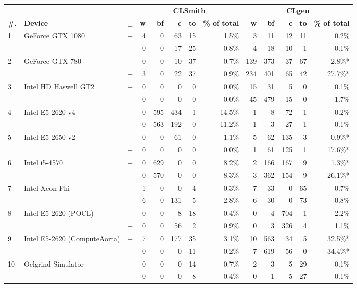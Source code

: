   \begin{tabular}{lll | rrrrr | rrrrr }
  \toprule
  & & & \multicolumn{5}{c|}{\textbf{CLSmith}} & \multicolumn{5}{c}{\textbf{CLgen}} \\
  \textbf{\#.} & \textbf{Device} & $\pm$ &
  \textbf{w} & \textbf{bf} & \textbf{c} & \textbf{to} & \textbf{\% of total} &
  \textbf{w} & \textbf{bf} & \textbf{c} & \textbf{to} & \textbf{\% of total} \\
  \midrule
  \multirow{ 2}{*}{1} & \multirow{ 2}{*}{GeForce GTX 1080} & $-$ & 4 & 0 & 63 & 15 & 1.5\%       & 3 & 11 & 12 & 11 & 0.2\% \\& & $+$ & 0 & 0 & 17 & 25 & 0.8\% & 4 & 18 & 10 & 1 & 0.1\% \\
\hline
\multirow{ 2}{*}{2} & \multirow{ 2}{*}{GeForce GTX 780} & $-$ & 0 & 0 & 10 & 37 & 0.7\%       & 139 & 373 & 37 & 67 & 2.8\%* \\& & $+$ & 3 & 0 & 22 & 37 & 0.9\% & 234 & 401 & 65 & 42 & 27.7\%* \\
\hline
\multirow{ 2}{*}{3} & \multirow{ 2}{*}{Intel HD Haswell GT2} & $-$ & 0 & 0 & 0 & 0 & 0.0\%       & 15 & 31 & 5 & 0 & 0.1\% \\& & $+$ & 0 & 0 & 0 & 0 & 0.0\% & 45 & 479 & 15 & 0 & 1.7\% \\
\hline
\multirow{ 2}{*}{4} & \multirow{ 2}{*}{Intel E5-2620 v4} & $-$ & 0 & 595 & 434 & 1 & 14.5\%       & 1 & 8 & 72 & 1 & 0.2\% \\& & $+$ & 0 & 563 & 192 & 0 & 11.2\% & 1 & 3 & 27 & 1 & 0.1\% \\
\hline
\multirow{ 2}{*}{5} & \multirow{ 2}{*}{Intel E5-2650 v2} & $-$ & 0 & 0 & 61 & 0 & 1.1\%       & 5 & 62 & 135 & 3 & 0.9\%* \\& & $+$ & 0 & 0 & 0 & 0 & 0.0\% & 1 & 61 & 125 & 1 & 17.6\%* \\
\hline
\multirow{ 2}{*}{6} & \multirow{ 2}{*}{Intel i5-4570} & $-$ & 0 & 629 & 0 & 0 & 8.2\%       & 2 & 166 & 167 & 9 & 1.3\%* \\& & $+$ & 0 & 570 & 0 & 0 & 8.3\% & 3 & 362 & 154 & 9 & 26.1\%* \\
\hline
\multirow{ 2}{*}{7} & \multirow{ 2}{*}{Intel Xeon Phi} & $-$ & 1 & 0 & 0 & 4 & 0.3\%       & 7 & 33 & 0 & 65 & 0.7\% \\& & $+$ & 6 & 0 & 131 & 5 & 2.8\% & 6 & 30 & 0 & 73 & 0.8\% \\
\hline
\multirow{ 2}{*}{8} & \multirow{ 2}{*}{Intel E5-2620 (POCL)} & $-$ & 0 & 0 & 8 & 18 & 0.4\%       & 0 & 4 & 704 & 1 & 2.2\% \\& & $+$ & 0 & 0 & 56 & 2 & 0.9\% & 0 & 3 & 326 & 4 & 1.1\% \\
\hline
\multirow{ 2}{*}{9} & \multirow{ 2}{*}{Intel E5-2620 (ComputeAorta)} & $-$ & 7 & 0 & 177 & 35 & 3.1\%       & 10 & 563 & 34 & 5 & 32.5\%* \\& & $+$ & 0 & 0 & 0 & 11 & 0.2\% & 7 & 619 & 56 & 0 & 34.4\%* \\
\hline
\multirow{ 2}{*}{10} & \multirow{ 2}{*}{Oclgrind Simulator} & $-$ & 0 & 0 & 0 & 14 & 0.7\%       & 2 & 3 & 5 & 29 & 0.1\% \\& & $+$ & 0 & 0 & 0 & 8 & 0.4\% & 0 & 1 & 5 & 27 & 0.1\% \\
  \bottomrule
\end{tabular}

